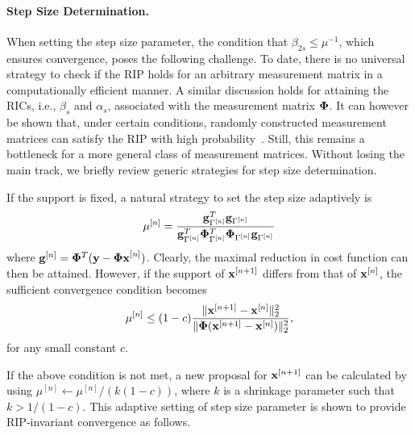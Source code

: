 \documentclass{article}
\begin{document}
\vspace{-0.5em}
\paragraph{Step Size Determination.} 
When setting the step size parameter, the condition that $\beta_{2s}\leq\mu^{-1}$, which ensures convergence, poses the following challenge. To date, there is no universal strategy  to check if the RIP holds for an arbitrary measurement matrix in a computationally efficient manner. A similar discussion holds for attaining the RICs, i.e., ${\beta_s}$ and $\alpha_s$, associated with the measurement matrix ${\bf \Phi}$. It can however be shown that, under certain conditions, randomly constructed measurement matrices can satisfy
the RIP with high probability~\cite{candes2008rip, chartrand2008rip}. Still, this remains a bottleneck for a more general class of
measurement matrices. Without losing the main track, we briefly review generic strategies for step size determination. 

If the support is fixed, a natural strategy to set the step size adaptively is~\cite{blumensath2010niht}
\begin{equation}\label{step_size}
\small
   \mu^{[n]} = \frac{{\bf g}^T_{\Gamma^{[n]}}{\bf g}_{\Gamma^{[n]}}}{{\bf g}^T_{\Gamma^{[n]}}{\bf \Phi}^T_{\Gamma^{[n]}}{\bf \Phi}_{\Gamma^{[n]}}{\bf g}_{\Gamma^{[n]}}}
\end{equation}
where ${\bf g}^{[n]} = {\bf \Phi}^T({\bf y}-{\bf \Phi x}^{[n]})$. Clearly, the maximal reduction in cost function can then be attained. However, if the support of ${\bf x}^{[n+1]}$ differs from that of ${\bf x}^{[n]}$, the sufficient convergence condition  becomes
\begin{equation}
\small
    \mu^{[n]} \leq(1-c) \frac{\|{\bf x}^{[n+1]}-{\bf x}^{[n]} \|_2^2}{\|{\bf \Phi}({\bf x}^{[n+1]}-{\bf x}^{[n]}) \|_2^2},
\end{equation}
for any small constant $c$.

If the above condition is not met, a new proposal for ${\bf x}^{[n+1]}$ can be calculated by using $\mu^{[n]}\leftarrow{\mu^{[n]}/(k(1-c))}$, where $k$ is a shrinkage parameter such that $k>1/(1-c)$.
This adaptive setting of step size parameter is shown to provide RIP-invariant convergence  as follows.
\end{document}
